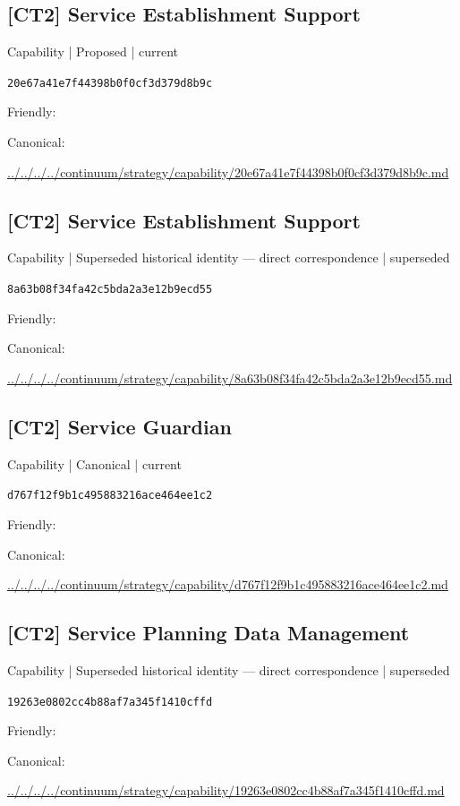 \documentclass[10pt,a4paper]{article}
\begin{document}
\subsection*{[CT2] Service Establishment Support}
{\small Capability | Proposed | current}\par
\texttt{20e67a41e7f44398b0f0cf3d379d8b9c}\par
Friendly: \par
Canonical: \par
{\footnotesize\url{../../../../continuum/strategy/capability/20e67a41e7f44398b0f0cf3d379d8b9c.md}}\par
\subsection*{[CT2] Service Establishment Support}
{\small Capability | Superseded historical identity — direct correspondence | superseded}\par
\texttt{8a63b08f34fa42c5bda2a3e12b9ecd55}\par
Friendly: \par
Canonical: \par
{\footnotesize\url{../../../../continuum/strategy/capability/8a63b08f34fa42c5bda2a3e12b9ecd55.md}}\par
\subsection*{[CT2] Service Guardian}
{\small Capability | Canonical | current}\par
\texttt{d767f12f9b1c495883216ace464ee1c2}\par
Friendly: \par
Canonical: \par
{\footnotesize\url{../../../../continuum/strategy/capability/d767f12f9b1c495883216ace464ee1c2.md}}\par
\subsection*{[CT2] Service Planning Data Management}
{\small Capability | Superseded historical identity — direct correspondence | superseded}\par
\texttt{19263e0802cc4b88af7a345f1410cffd}\par
Friendly: \par
Canonical: \par
{\footnotesize\url{../../../../continuum/strategy/capability/19263e0802cc4b88af7a345f1410cffd.md}}\par
\end{document}
